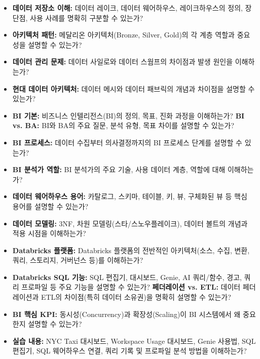 \documentclass[11pt,a4paper]{article}
\theoremstyle{definition}
\begin{document}
\begin{summarybox}[title=학습 및 복습 체크리스트]
\begin{itemize}
    \item \textbf{데이터 저장소 이해:} 데이터 레이크, 데이터 웨어하우스, 레이크하우스의 정의, 장단점, 사용 사례를 명확히 구분할 수 있는가?
    \item \textbf{아키텍처 패턴:} 메달리온 아키텍처(Bronze, Silver, Gold)의 각 계층 역할과 중요성을 설명할 수 있는가?
    \item \textbf{데이터 관리 문제:} 데이터 사일로와 데이터 스웜프의 차이점과 발생 원인을 이해하는가?
    \item \textbf{현대 데이터 아키텍처:} 데이터 메시와 데이터 패브릭의 개념과 차이점을 설명할 수 있는가?
    \item \textbf{BI 기본:} 비즈니스 인텔리전스(BI)의 정의, 목표, 진화 과정을 이해하는가?
    \textbf{BI vs. BA:} BI와 BA의 주요 질문, 분석 유형, 목표 차이를 설명할 수 있는가?
    \item \textbf{BI 프로세스:} 데이터 수집부터 의사결정까지의 BI 프로세스 단계를 설명할 수 있는가?
    \item \textbf{BI 분석가 역할:} BI 분석가의 주요 기술, 사용 데이터 계층, 역할에 대해 이해하는가?
    \item \textbf{데이터 웨어하우스 용어:} 카탈로그, 스키마, 테이블, 키, 뷰, 구체화된 뷰 등 핵심 용어를 설명할 수 있는가?
    \item \textbf{데이터 모델링:} 3NF, 차원 모델링(스타/스노우플레이크), 데이터 볼트의 개념과 적용 시점을 이해하는가?
    \item \textbf{Databricks 플랫폼:} Databricks 플랫폼의 전반적인 아키텍처(소스, 수집, 변환, 쿼리, 스토리지, 거버넌스 등)를 이해하는가?
    \item \textbf{Databricks SQL 기능:} SQL 편집기, 대시보드, Genie, AI 쿼리/함수, 경고, 쿼리 프로파일 등 주요 기능을 설명할 수 있는가?
    \textbf{페더레이션 vs. ETL:} 데이터 페더레이션과 ETL의 차이점(특히 데이터 소유권)을 명확히 설명할 수 있는가?
    \item \textbf{BI 핵심 KPI:} 동시성(Concurrency)과 확장성(Scaling)이 BI 시스템에서 왜 중요한지 설명할 수 있는가?
    \item \textbf{실습 내용:} NYC Taxi 대시보드, Workspace Usage 대시보드, Genie 사용법, SQL 편집기, SQL 웨어하우스 연결, 쿼리 기록 및 프로파일 분석 방법을 이해하는가?
\end{itemize}
\end{summarybox}
\end{document}
